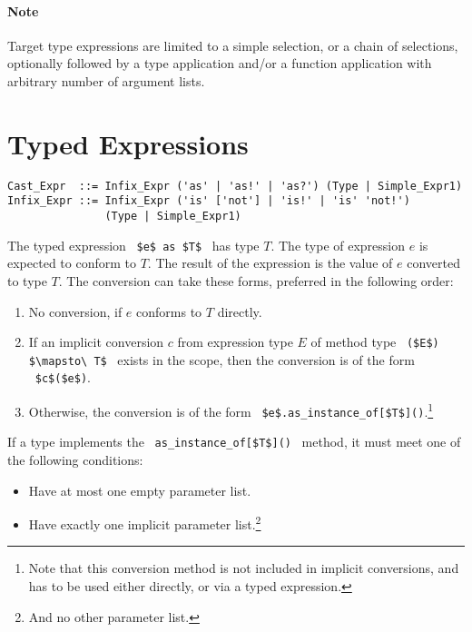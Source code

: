 \paragraph{Note}
Target type expressions are limited to a simple selection, or a chain of selections, optionally followed by a type application and/or a function application with arbitrary number of argument lists. 




\section{Typed Expressions}
\label{sec:typed-expressions}

\syntax\begin{lstlisting}
Cast_Expr  ::= Infix_Expr ('as' | 'as!' | 'as?') (Type | Simple_Expr1)
Infix_Expr ::= Infix_Expr ('is' ['not'] | 'is!' | 'is' 'not!') 
               (Type | Simple_Expr1)
\end{lstlisting}

The typed expression ~\lstinline!$e$ as $T$!~ has type $T$. The type of expression $e$ is expected to conform to $T$. The result of the expression is the value of $e$ converted to type $T$. The conversion can take these forms, preferred in the following order:
\begin{enumerate}
  \item No conversion, if $e$ conforms to $T$ directly. 
  \item If an implicit conversion $c$ from expression type $E$ of method type ~\lstinline!($E$) $\mapsto\ T$!~ exists in the scope, then the conversion is of the form ~\lstinline!$c$($e$)!. 
  \item Otherwise, the conversion is of the form ~\lstinline!$e$.as_instance_of[$T$]()!.\footnote{Note that this conversion method is not included in implicit conversions, and has to be used either directly, or via a typed expression.}
\end{enumerate}

If a type implements the ~\lstinline!as_instance_of[$T$]()!~ method, it must meet one of the following conditions:
\begin{itemize}
  \item Have at most one empty parameter list.
  \item Have exactly one implicit parameter list.\footnote{And no other parameter list.}
\end{itemize}

